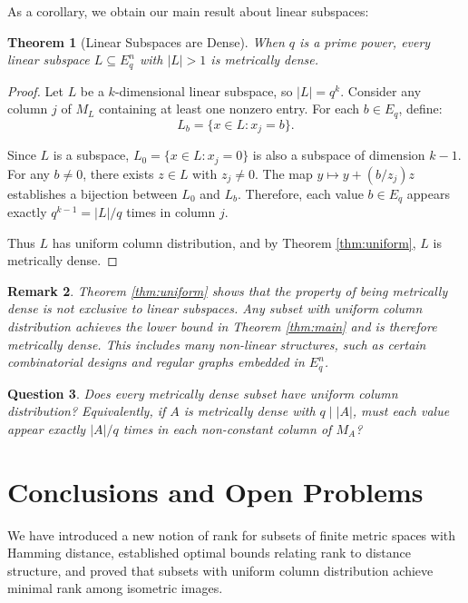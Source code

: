 \documentclass[12pt]{article}
\newtheorem{theorem}{Theorem}[section]
\newtheorem{remark}[theorem]{Remark}
\newtheorem{question}[theorem]{Question}
\newcommand{\Eq}{E_q}
\newcommand{\Eqn}{E_q^n}
\begin{document}
As a corollary, we obtain our main result about linear subspaces:

\begin{theorem}[Linear Subspaces are Dense]
\label{thm:linear}
When $q$ is a prime power, every linear subspace $L \subseteq \Eqn$ with $|L| > 1$ is metrically dense.
\end{theorem}

\begin{proof}
Let $L$ be a $k$-dimensional linear subspace, so $|L| = q^k$. Consider any column $j$ of $M_L$ containing at least one nonzero entry. For each $b \in \Eq$, define:
\[
L_b = \{x \in L : x_j = b\}.
\]

Since $L$ is a subspace, $L_0 = \{x \in L : x_j = 0\}$ is also a subspace of dimension $k-1$. For any $b \neq 0$, there exists $z \in L$ with $z_j \neq 0$. The map $y \mapsto y + (b/z_j)z$ establishes a bijection between $L_0$ and $L_b$. Therefore, each value $b \in \Eq$ appears exactly $q^{k-1} = |L|/q$ times in column $j$.

Thus $L$ has uniform column distribution, and by Theorem \ref{thm:uniform}, $L$ is metrically dense.
\end{proof}

\begin{remark}
Theorem \ref{thm:uniform} shows that the property of being metrically dense is not exclusive to linear subspaces. Any subset with uniform column distribution achieves the lower bound in Theorem \ref{thm:main} and is therefore metrically dense. This includes many non-linear structures, such as certain combinatorial designs and regular graphs embedded in $\Eqn$.
\end{remark}

\begin{question}
Does every metrically dense subset have uniform column distribution? Equivalently, if $A$ is metrically dense with $q \mid |A|$, must each value appear exactly $|A|/q$ times in each non-constant column of $M_A$?
\end{question}

\section{Conclusions and Open Problems}
\label{sec:conclude}

We have introduced a new notion of rank for subsets of finite metric spaces with Hamming distance, established optimal bounds relating rank to distance structure, and proved that subsets with uniform column distribution achieve minimal rank among isometric images.
\end{document}
